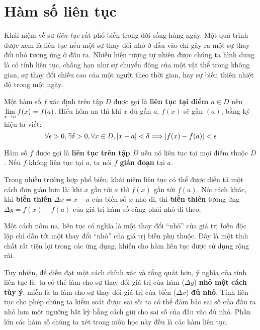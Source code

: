 \section{Hàm số liên tục}
\label{sec:ham-so-lien-tuc}

Khái niệm về sự \textit{liên tục} rất phổ biến trong đời sống hàng ngày. Một quá trình được xem là liên tục nếu một sự thay đổi nhỏ ở đầu vào chỉ gây ra một sự thay đổi nhỏ tương ứng ở đầu ra. Nhiều hiện tượng tự nhiên được chúng ta hình dung là có tính liên tục, chẳng hạn như sự chuyển động của một vật thể trong không gian, sự thay đổi chiều cao của một người theo thời gian, hay sự biến thiên nhiệt độ trong một ngày.

\begin{definition}
    \label{def:continous-function}
    Một hàm số $f$ xác định trên tập $D$ được gọi là \textbf{liên tục tại điểm $a \in D$} nếu $\lim\limits_{x \to a} f(x) = f(a)$. Hiểu hôm na thì khi $x$ đủ gần $a$, $f(x)$ sẽ gần $(a)$, bằng ký hiệu ta viết:
    \[\forall \epsilon > 0, \exists \delta > 0, \forall x \in D, \left\lvert x - a \right\rvert < \delta \Longrightarrow \left\lvert f(x) - f(a) \right\rvert < \epsilon\]
    
    Hàm số $f$ được gọi là \textbf{liên tục trên tập $D$} nếu nó liên tục tại mọi điểm thuộc $D$. Nếu $f$ không liên tục tại $a$, ta nói $f$ \textbf{gián đoạn} tại $a$.
\end{definition}


Trong nhiều trường hợp phổ biến, khái niệm liên tục có thể được diễn tả một cách đơn giản hơn là: khi $x$ gần tới $a$ thì $f(x)$ gần tới $f(a)$. Nói cách khác, khi \textbf{biến thiên} $\Delta x = x - a$ của biến số $x$ nhỏ đi, thì \textbf{biến thiên} tương ứng $\Delta y = f(x) - f(a)$ của giá trị hàm số cũng phải nhỏ đi theo.

Một cách nôm na, liên tục có nghĩa là một thay đổi ``nhỏ'' của giá trị biến độc lập chỉ dẫn tới một thay đổi ``nhỏ'' của giá trị biến phụ thuộc. Đây là một tính chất rất tiện lợi trong các ứng dụng, khiến cho hàm liên tục được sử dụng rộng rãi.

Tuy nhiên, để diễn đạt một cách chính xác và tổng quát hơn, ý nghĩa của tính liên tục là: ta có thể làm cho sự thay đổi giá trị của hàm ($\Delta y$) \textbf{nhỏ một cách tùy ý}, miễn là ta làm cho sự thay đổi giá trị của biến ($\Delta x$) \textbf{đủ nhỏ}. Tính liên tục cho phép chúng ta kiểm soát được sai số: ta có thể đảm bảo sai số của đầu ra nhỏ hơn một ngưỡng bất kỳ bằng cách giữ cho sai số của đầu vào đủ nhỏ. Phần lớn các hàm số chúng ta xét trong môn học này đều là các hàm liên tục.

